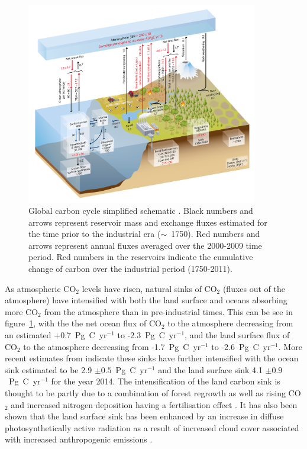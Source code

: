 \begin{figure}[ht]
    \centering
    \includegraphics[width=0.9\textwidth]{chapter/chapter1/ipcc_fig6_1.jpg}
    \caption{Global carbon cycle simplified schematic \citep{ciais2014carbon}. Black numbers and arrows represent reservoir mass and exchange fluxes estimated for the time prior to the industrial era (\(\sim\)~1750). Red numbers and arrows represent annual fluxes averaged over the 2000-2009 time period. Red numbers in the reservoirs indicate the cumulative change of carbon over the industrial period (1750-2011).}
    \label{chap1:fig:ipcc_fig6.1}
\end{figure}

As atmospheric CO\(_{2}\) levels have risen, natural sinks of CO\(_{2}\) (fluxes out of the atmosphere) have intensified with both the land surface and oceans absorbing more CO\(_{2}\) from the atmosphere than in pre-industrial times. This can be see in figure~\ref{chap1:fig:ipcc_fig6.1}, with the the net ocean flux of CO\(_{2}\) to the atmosphere decreasing from an estimated +0.7~Pg~C~yr\(^{-1}\) to -2.3~Pg~C~yr\(^{-1}\), and the land surface flux of CO\(_{2}\) to the atmosphere decreasing from -1.7~Pg~C~yr\(^{-1}\) to -2.6~Pg~C~yr\(^{-1}\). More recent estimates from \citet{le2015global} indicate these sinks have further intensified with the ocean sink estimated to be 2.9 \(\pm 0.5\)~Pg~C~yr\(^{-1}\) and the land surface sink 4.1 \(\pm 0.9\)~Pg~C~yr\(^{-1}\) for the year 2014. The intensification of the land carbon sink is thought to be partly due to a combination of forest regrowth as well as rising CO\(_{2}\) and increased nitrogen deposition having a fertilisation effect \citep{ciais2014carbon}. It has also been shown that the land surface sink has been enhanced by an increase in diffuse photosynthetically active radiation as a result of increased cloud cover associated with increased anthropogenic emissions \citep{Mercadodiffuseradiation2009}. 

